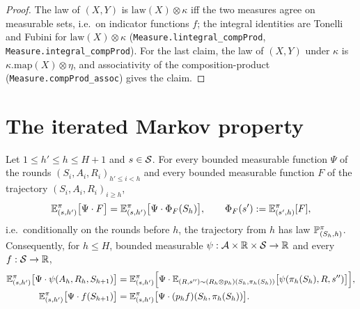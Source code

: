 \begin{proof}
\leanok
The law of $(X, Y)$ is $\mathrm{law}(X) \otimes \kappa$ iff the two measures agree on measurable sets,
i.e.\ on indicator functions $f$; the integral identities are Tonelli and Fubini for
$\mathrm{law}(X) \otimes \kappa$ (\texttt{Measure.lintegral\_compProd},
\texttt{Measure.integral\_compProd}). For the last claim, the law of $(X, Y)$ under $\kappa$ is
$\kappa.\mathrm{map}(X) \otimes \eta$, and associativity of the composition-product
(\texttt{Measure.compProd\_assoc}) gives the claim.
\end{proof}

\section{The iterated Markov property}
\label{sec:pre_mdp_markov}

\begin{lemma}\label{lem:pmdp_markov_iter}
\leanok
{}
Let $1 \le h' \le h \le H + 1$ and $s \in \mathcal{S}$. For every bounded measurable function $\Psi$ of
the rounds $(S_i, A_i, R_i)_{h' \le i < h}$ and every bounded measurable function $F$ of the
trajectory $(S_i, A_i, R_i)_{i \ge h}$,
\[
  \mathbb{E}^\pi_{(s,h')}\big[\Psi\cdot F\big] = \mathbb{E}^\pi_{(s,h')}\big[\Psi\cdot \Phi_F(S_h)\big],
  \qquad \Phi_F(s') := \mathbb{E}^\pi_{(s', h)}[F] ,
\]
i.e.\ conditionally on the rounds before $h$, the trajectory from $h$ has law
$\mathbb{P}^\pi_{(S_h, h)}$. Consequently, for $h \le H$, bounded measurable
$\psi : \mathcal{A} \times \mathbb{R} \times \mathcal{S} \to \mathbb{R}$ and every $f : \mathcal{S} \to \mathbb{R}$,
\begin{align*}
  \mathbb{E}^\pi_{(s,h')}\big[\Psi\cdot\psi(A_h, R_h, S_{h+1})\big]
  &= \mathbb{E}^\pi_{(s,h')}\Big[\Psi\cdot\mathbb{E}_{(R, s'') \sim (R_h \otimes p_h)(S_h, \pi_h(S_h))}\big[\psi(\pi_h(S_h), R, s'')\big]\Big], \\
  \mathbb{E}^\pi_{(s,h')}\big[\Psi\cdot f(S_{h+1})\big]
  &= \mathbb{E}^\pi_{(s,h')}\big[\Psi\cdot (p_h f)(S_h, \pi_h(S_h))\big] .
\end{align*}
\end{lemma}

